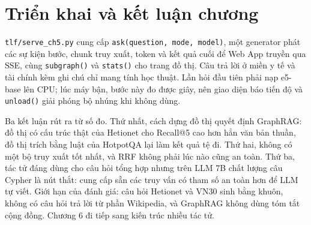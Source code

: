 
\section{Triển khai và kết luận chương}

\texttt{tlf/serve\_ch5.py} cung cấp \texttt{ask(question, mode, model)}, một generator phát các sự kiện bước, chunk truy xuất, token và kết quả cuối để Web App truyền qua SSE, cùng \texttt{subgraph()} và \texttt{stats()} cho trang đồ thị. Câu trả lời ở miền y tế và tài chính kèm ghi chú chỉ mang tính học thuật. Lần hỏi đầu tiên phải nạp e5-base lên CPU; lúc máy bận, bước này đo được  giây, nên giao diện báo tiến độ và \texttt{unload()} giải phóng bộ nhúng khi không dùng.

Ba kết luận rút ra từ số đo. Thứ nhất, cách dựng đồ thị quyết định GraphRAG: đồ thị có cấu trúc thật của Hetionet cho Recall@5 cao hơn hẳn văn bản thuần, đồ thị trích bằng luật của HotpotQA lại làm kết quả tệ đi. Thứ hai, không có một bộ truy xuất tốt nhất, và RRF không phải lúc nào cũng an toàn. Thứ ba, tác tử đáng dùng cho câu hỏi tổng hợp nhưng trên LLM 7B chất lượng câu Cypher là nút thắt: cung cấp sẵn các truy vấn có tham số an toàn hơn để LLM tự viết. Giới hạn của đánh giá: câu hỏi Hetionet và VN30 sinh bằng khuôn, không có câu hỏi trả lời từ phần Wikipedia, và GraphRAG không dùng tóm tắt cộng đồng. Chương 6 đi tiếp sang kiến trúc nhiều tác tử.
